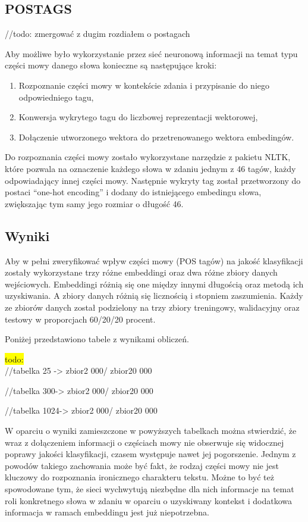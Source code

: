 \subsection{POSTAGS}
//todo: zmergować z dugim rozdiałem o postagach

Aby możliwe było wykorzystanie przez sieć neuronową informacji na temat typu części mowy danego słowa konieczne są następujące kroki: 

\begin{enumerate}
    \item Rozpoznanie części mowy w kontekście zdania i przypisanie do niego odpowiedniego tagu,
    \item Konwersja wykrytego tagu do liczbowej reprezentacji wektorowej,
    \item Dołączenie utworzonego wektora do przetrenowanego wektora embedingów.  
\end{enumerate}

\hfill \break %
Do rozpoznania części mowy zostało wykorzystane narzędzie z pakietu NLTK, które pozwala na oznaczenie każdego słowa w zdaniu jednym z 46 tagów, każdy odpowiadający innej części mowy. Następnie wykryty tag został przetworzony do postaci “one-hot encoding” i dodany do istniejącego embedingu słowa, zwiększając tym samy jego rozmiar o długość 46. 


\subsection{Wyniki}

Aby w pełni zweryfikować wpływ części mowy (POS tagów) na jakość klasyfikacji zostały wykorzystane trzy różne embeddingi oraz dwa różne zbiory danych wejściowych. Embeddingi różnią się one między innymi długością oraz metodą ich uzyskiwania. A zbiory danych różnią się licznością i stopniem zaszumienia. Każdy ze zbiorów danych został podzielony na trzy zbiory treningowy, walidacyjny oraz testowy w proporcjach 60/20/20 procent. 

Poniżej przedstawiono tabele z wynikami obliczeń. 

\colorbox{yellow}{todo:}\\ 
//tabelka 25 -> zbior2 000/ zbior20 000 

//tabelka 300-> zbior2 000/ zbior20 000 

//tabelka 1024-> zbior2 000/ zbior20 000 

W oparciu o wyniki zamieszczone w powyższych tabelkach można stwierdzić, że wraz z dołączeniem informacji o częściach mowy nie obserwuje się widocznej poprawy jakości klasyfikacji, czasem występuje nawet jej pogorszenie. Jednym z powodów takiego zachowania może być fakt, że rodzaj części mowy nie jest kluczowy do rozpoznania ironicznego charakteru tekstu. Możne to być też spowodowane tym, że sieci wychwytują niezbędne dla nich informacje na temat roli konkretnego słowa w zdaniu w oparciu o uzyskiwany kontekst i dodatkowa informacja w ramach embeddingu jest już niepotrzebna. 

